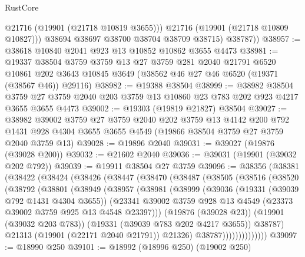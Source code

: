 \begin{lexlean}{RustCore}
\begin{coremodule}
              @21716
              (@19901 (@21718 @10819 @3655)))
            @21716
            (@19901 (@21718 @10809 @10827)))
          @38694
          @38697
          @38700
          @38704
          @38709
          @38715)
        @38787))
@38957 := @38618 @10840 @2041 @923 @13 @10852 @10862 @3655 @4473
@38981 := @19337
    @38504
    @3759
    @3759
    @13
    @27
    @3759
    @281
    @2040
    @21791
    @6520
    @10861
    @202
    @3643
    @10845
    @3649
    (@38562 @46 @27 @46 @6520 (@19371 (@38567 @46)) @29116)
@38982 := @19388 @38504
@38999 := @38982
    @38504
    @3759
    @27
    @3759
    @2040
    @203
    @3759
    @13
    @10860
    @23
    @783
    @202
    @923
    @4217
    @3655
    @3655
    @4473
@39002 := @19303 (@19819 @21827) @38504
@39027 := @38982
    @39002
    @3759
    @27
    @3759
    @2040
    @202
    @3759
    @13
    @4142
    @200
    @792
    @1431
    @928
    @4304
    @3655
    @3655
    @4549
    (@19866 @38504 @3759 @27 @3759 @2040 @3759 @13)
@39028 := @19896 @2040
@39031 := @39027 (@19876 (@39028 @200))
@39032 := @21602 @2040
@39036 := @39031 (@19901 (@39032 @202 @792))
@39039 := @19911 @38504 @27 @3759
@39096 := @38356
    (@38381
      (@38422
        (@38424
          (@38426
            (@38447
              (@38470
                (@38487
                  (@38505
                    (@38516
                      (@38520
                        (@38792
                          (@38801
                            (@38949
                              (@38957
                                (@38981
                                  (@38999
                                    (@39036
                                      (@19331 (@39039 @792 @1431 @4304 @3655))
                                      (@23341
                                        @39002
                                        @3759
                                        @928
                                        @13
                                        @4549
                                        (@23373 @39002 @3759 @925 @13 @4548 @23397)))
                                    (@19876 (@39028 @23))
                                    (@19901 (@39032 @203 @783))
                                    (@19331 (@39039 @783 @202 @4217 @3655))
                                    @38787)
                                  @21313
                                  (@19901 (@22171 @2040 @21791))
                                  @21326)
                                @38787))))))))))))))
@39097 := @18990 @250
@39101 := @18992 (@18996 @250) (@19002 @250)

\end{coremodule}
\end{lexlean}
